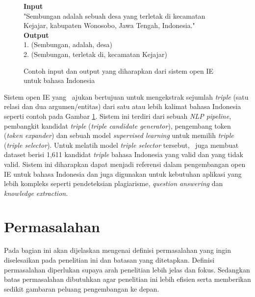 \begin{figure}
	\begin{mdframed}
		\textbf{Input} \\
		"Sembungan adalah sebuah desa yang terletak di kecamatan Kejajar, kabupaten Wonosobo, Jawa Tengah, Indonesia." \\
		
		\textbf{Output} \\
		1. (Sembungan, adalah, desa) \\
		2. (Sembungan, terletak di, kecamatan Kejajar)
	\end{mdframed}
	\caption{Contoh input dan output yang diharapkan dari sistem open IE untuk bahasa Indonesia}
	\label{fig:example_io_openie}
\end{figure}

Sistem open IE yang \saya~ajukan bertujuan untuk mengekstrak sejumlah \textit{triple} (satu relasi dan dua argumen/entitas) dari satu atau lebih kalimat bahasa Indonesia seperti contoh pada Gambar \ref{fig:example_io_openie}. Sistem ini terdiri dari sebuah \textit{NLP pipeline}, pembangkit kandidat \textit{triple} (\textit{triple candidate generator}), pengembang token (\textit{token expander}) dan sebuah model \textit{supervised learning} untuk memilih \textit{triple} (\textit{triple selector}). Untuk melatih model \textit{triple selector} tersebut, \saya~juga membuat dataset berisi 1,611 kandidat \textit{triple} bahasa Indonesia yang valid dan yang tidak valid. Sistem ini diharapkan dapat menjadi referensi dalam pengembangan open IE untuk bahasa Indonesia dan juga digunakan untuk kebutuhan aplikasi yang lebih kompleks seperti pendeteksian plagiarisme, \textit{question answering} dan \textit{knowledge extraction}.

\section{Permasalahan}
Pada bagian ini akan dijelaskan mengenai definisi permasalahan yang ingin diselesaikan pada penelitian ini dan batasan yang ditetapkan. Definisi permasalahan diperlukan supaya arah penelitian lebih jelas dan fokus. Sedangkan batas permasalahan dibutuhkan agar penelitian ini lebih efisien serta memberikan sedikit gambaran peluang pengembangan ke depan.

